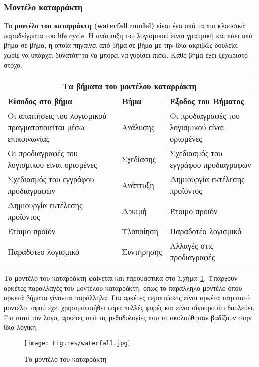 \subsubsection{Μοντέλο καταρράκτη}

Το \textbf{μοντέλο του καταρράκτη (waterfall model)} είναι ένα από τα πιο κλασσικά παραδείγματα του life cycle. Η ανάπτυξη του λογισμικού είναι γραμμική και πάει από βήμα σε βήμα, η οποία πηγαίνει από βήμα σε βήμα με την ίδια ακριβώς δουλεία, χωρίς να υπάρχει δυνατότητα να μπορεί να γυρίσει πίσω. Κάθε βήμα έχει ξεχωριστό στόχο.

\begin{center}
    \begin{tabular}{| p{7cm} | p{2cm} | p{6.5cm} |}
        \hline
        \multicolumn{3}{|c|}{\textbf{Τα βήματα του μοντέλου καταρράκτη}} \\
        \hline
        \textbf{Είσοδος στο βήμα} & \textbf{Βήμα} & \textbf{Έξοδος του Βήματος} \\
        \hline
        Οι απαιτήσεις του λογισμικού πραγματοποιείται μέσω επικοινωνίας & Ανάλυσης &  Οι προδιαγραφές του λογισμικού είναι ορισμένες \\
        \hline
        Οι προδιαγραφές του λογισμικού είναι ορισμένες & Σχεδίασης & Σχεδιασμός του εγγράφου προδιαγραφών \\
        \hline
        Σχεδιασμός του εγγράφου προδιαγραφών & Ανάπτυξη & Δημιουργία εκτέλεσης προϊόντος \\
        \hline
        Δημιουργία εκτέλεσης προϊόντος & Δοκιμή & Έτοιμο προϊόν \\
        \hline
        Έτοιμο προϊόν & Υλοποίηση & Παραδοτέο λογισμικό \\
        \hline
        Παραδοτέο λογισμικό & Συντήρησης & Αλλαγές στις προδιαγραφές \\
        \hline
    \end{tabular}
\end{center}

Το μοντέλο του καταρράκτη φαίνεται και παρουαστικά στο Σχήμα~\ref{fig:waterfall}. Υπάρχουν αρκέτες παραλλαγές του μοντέλου καταρράκτη, όπως το παράλληλο μοντέλο
όπου αρκετά βήματα γίνονται παράλληλα. Για αρκέτες περιπτώσεις είναι αρκέτα ταιριαστό μοντέλο, αφού έχει χρησιμοποιήθει πάρα πολλές φορές και είναι σίγουρο ότι δουλεύει.
Για αυτό τον λόγο, αρκέτες από τις μεθοδολογίες που το ακολούθησαν βαδίζουν στην ίδια λογική.

\begin{figure}[th]
    \centering
    \texttt{[image: Figures/waterfall.jpg]}
    \caption[Το μοντέλο του καταρράκτη]{Το μοντέλο του καταρράκτη}
    \label{fig:waterfall}
\end{figure}

